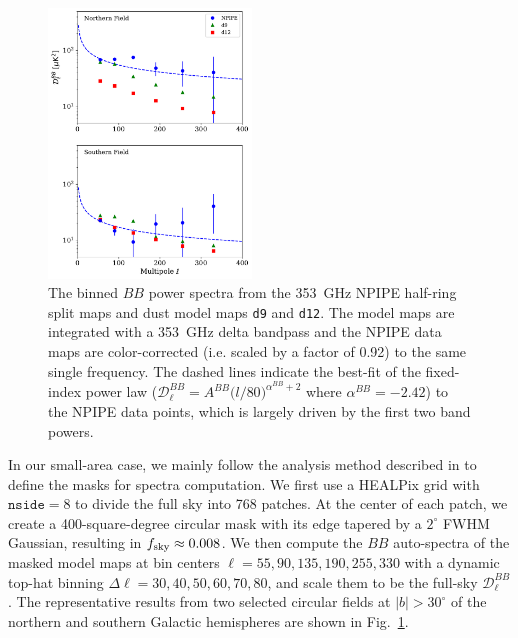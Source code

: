 \documentclass[twocolumn]{aastex631}
\newcommand{\dnine}{{\tt d9}}
\begin{document}

\begin{figure}
    \centering
    \includegraphics[width=0.48\textwidth]{figures/smallfield_power.pdf}
    \caption{The binned $BB$ power spectra from the 353~GHz NPIPE half-ring split maps and dust model maps \texttt{d9} and \texttt{d12}. The model maps are integrated with a 353~GHz delta bandpass and the NPIPE data maps are color-corrected (i.e. scaled by a factor of 0.92) to the same single frequency. The dashed lines indicate the best-fit of the fixed-index power law ($\mathcal{D}_\ell^{BB} = A^{BB} \big( l/80 \big)^{\alpha^{BB}+2}$ where $\alpha^{BB} = -2.42$) to the NPIPE data points, which is largely driven by the first two band powers.}
    \label{fig:smallfield_power}
\end{figure}

In our small-area case, we mainly follow the analysis method described in \cite{planck2014-XXX} to define the masks for spectra computation. We first use a HEALPix grid with $\texttt{nside} = 8$ to divide the full sky into 768 patches. At the center of each patch, we create a 400-square-degree circular mask with its edge tapered by a $2^\circ$ FWHM Gaussian, resulting in $f_{\rm sky} \approx 0.008$. We then compute the $BB$ auto-spectra of the masked model maps at bin centers $\ell = 55,90,135,190,255,330$ with a dynamic top-hat binning $\Delta \ell = 30,40,50,60,70,80$, and scale them to be the full-sky $\mathcal{D}_\ell^{BB}$. The representative results from two selected circular fields at $|b| > 30^\circ$ of the northern and southern Galactic hemispheres are shown in Fig.~\ref{fig:smallfield_power}. 
\end{document}
